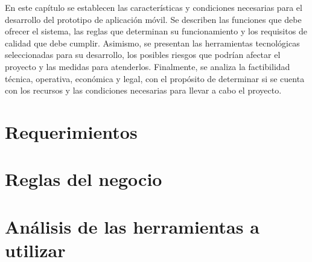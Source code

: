 En este capítulo se establecen las características y condiciones necesarias para el desarrollo del prototipo de aplicación móvil. Se describen las funciones que debe ofrecer el sistema, las reglas que determinan su funcionamiento y los requisitos de calidad que debe cumplir. Asimismo, se presentan las herramientas tecnológicas seleccionadas para su desarrollo, los posibles riesgos que podrían afectar el proyecto y las medidas para atenderlos. Finalmente, se analiza la factibilidad técnica, operativa, económica y legal, con el propósito de determinar si se cuenta con los recursos y las condiciones necesarias para llevar a cabo el proyecto.
\section{Requerimientos}
\label{sec:requerimientos}


\section{Reglas del negocio}
\label{sec:reglas_negocio}


\section{Análisis de las herramientas a utilizar}
\label{sec:analisis_herramientas}


